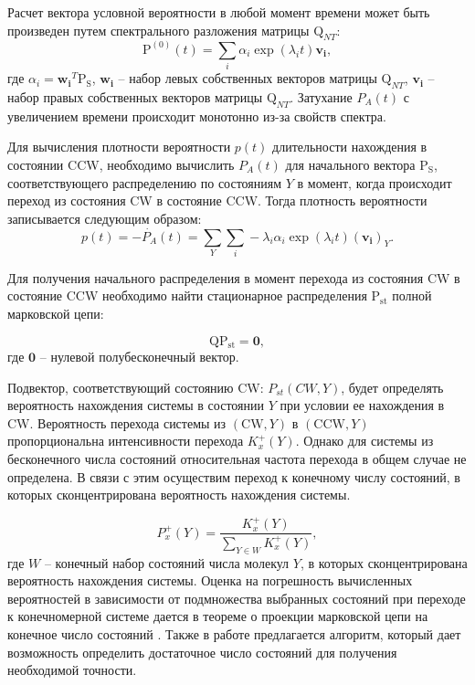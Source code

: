 Расчет вектора условной вероятности в любой момент времени может быть произведен путем спектрального разложения матрицы $\boldsymbol{\mathrm{Q}}_{NT}$:
\begin{equation}
    \boldsymbol{\mathrm{P}}^{(0)}(t) = \sum_i \alpha_i \exp(\lambda_i t) \boldsymbol{v_i},
    \label{eq:solution-no-transition-prob}
\end{equation}
где $\alpha_i=\boldsymbol{w_i}^T \boldsymbol{\mathrm{P_S}}$, $\boldsymbol{w_i}$ -- набор левых собственных векторов матрицы $\boldsymbol{\mathrm{Q}}_{NT}$, $\boldsymbol{v_i}$ -- набор правых собственных векторов матрицы $\boldsymbol{\mathrm{Q}}_{NT}$. Затухание $P_A(t)$ с увеличением времени происходит монотонно из-за свойств спектра.

Для вычисления плотности вероятности $p(t)$ длительности нахождения в состоянии CCW, необходимо вычислить $P_A(t)$ для начального вектора $\boldsymbol{\mathrm{P_S}}$, соответствующего распределению по состояниям $Y$ в момент, когда происходит переход из состояния CW в состояние CCW.
Тогда плотность вероятности записывается следующим образом:
\begin{equation}
    p(t) = -\dot{P_A}(t) = \sum_Y \sum_i -\lambda_i \alpha_i \exp(\lambda_i t) (\boldsymbol{v_i})_Y.
    \label{eq:solution-no-transition-pdf}
\end{equation}

Для получения начального распределения в момент перехода из состояния CW в состояние CCW необходимо найти стационарное распределения $\boldsymbol{\mathrm{P_{st}}}$ полной марковской цепи:

\begin{equation}
    \boldsymbol{\mathrm{Q}} \boldsymbol{\mathrm{P_{st}}} = \boldsymbol{0},
    \label{eq:transitions-stationary}
\end{equation}
где $\boldsymbol{0}$ -- нулевой полубесконечный вектор.

Подвектор, соответствующий состоянию CW: ${P_{st}(CW, Y)}$, будет определять вероятность нахождения системы в состоянии $Y$ при условии ее нахождения в CW. Вероятность перехода системы из $(\mathrm{CW}, Y)$ в $(\mathrm{CCW}, Y)$ пропорциональна интенсивности перехода $K_x^+(Y)$. Однако для системы из бесконечного числа состояний относительная частота перехода в общем случае не определена. В связи с этим осуществим переход к конечному числу состояний, в которых сконцентрирована вероятность нахождения системы. 

\begin{equation}
    P_x^+(Y)=\frac{K_x^+(Y)}{\sum_{Y\in W} K_x^+(Y)},
    \label{eq:cw-to-ccw-prob}
\end{equation}
где $W$ -- конечный набор состояний числа молекул $Y$, в которых сконцентрирована вероятность нахождения системы. Оценка на погрешность вычисленных вероятностей в зависимости от подмножества выбранных состояний при переходе к конечномерной системе дается в теореме о проекции марковской цепи на конечное число состояний \cite{munsky_finite_2006}. Также в работе предлагается алгоритм, который дает возможность определить достаточное число состояний для получения необходимой точности.

